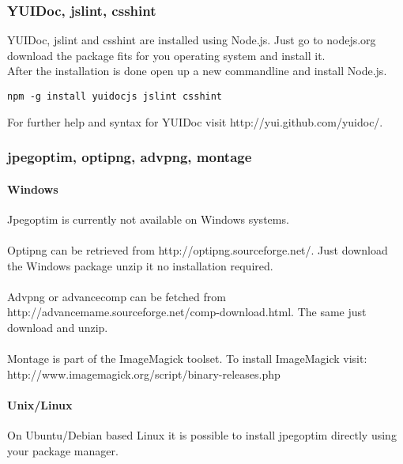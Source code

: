 \subsubsection{YUIDoc, jslint, csshint}
YUIDoc, jslint and csshint are installed using Node.js. Just go to nodejs.org download the package fits for you operating system and install it. \\
After the installation is done open up a new commandline and install Node.js.

\begin{verbatim}
npm -g install yuidocjs jslint csshint
\end{verbatim}

\noindent For further help and syntax for YUIDoc visit http://yui.github.com/yuidoc/.


\subsubsection{jpegoptim, optipng, advpng, montage}

\paragraph{Windows\\}
\noindent Jpegoptim is currently not available on Windows systems.\\
\\
Optipng can be retrieved from http://optipng.sourceforge.net/. Just download the Windows package unzip it no installation required.\\
\\
Advpng or advancecomp can be fetched from http://advancemame.sourceforge.net/comp-download.html. The same just download and unzip.\\
\\
Montage is part of the ImageMagick toolset. To install ImageMagick visit:\\
http://www.imagemagick.org/script/binary-releases.php \\

\paragraph{Unix/Linux\\}
On Ubuntu/Debian based Linux it is possible to install jpegoptim directly using your package manager.\\

